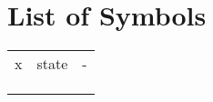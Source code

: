 \chapter*{List of Symbols}

\begin{table}[h!]
\centering
\begin{tabular}{lll}
x & state & - \\
  &       &   \\
  &       &   \\
  &       &  
\end{tabular}
\end{table}